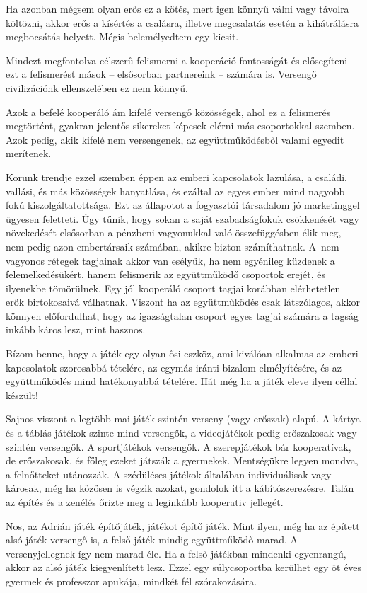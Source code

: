 \documentclass[12pt,a4paper]{article}
\begin{document}
Ha azonban mégsem olyan erős ez a kötés, mert igen könnyű válni vagy távolra költözni, akkor erős a kísértés a csalásra, illetve megcsalatás esetén a kihátrálásra megbocsátás helyett.
Mégis belemélyedtem egy kicsit.

Mindezt megfontolva célszerű felismerni a kooperáció fontosságát és elősegíteni ezt a felismerést mások -- elsősorban partnereink -- számára is.
Versengő civilizációnk ellenszelében ez nem könnyű.

Azok a befelé kooperáló ám kifelé versengő közösségek, ahol ez a felismerés megtörtént, gyakran jelentős sikereket képesek elérni más csoportokkal szemben.
Azok pedig, akik kifelé nem versengenek, az együttműködésből valami egyedit merítenek.

Korunk trendje ezzel szemben éppen az emberi kapcsolatok lazulása, a családi, vallási, és más közösségek hanyatlása, és ezáltal az egyes ember mind nagyobb fokú kiszolgáltatottsága.
Ezt az állapotot a fogyasztói társadalom jó marketinggel ügyesen feletteti.
Úgy tűnik, hogy sokan a saját szabadságfokuk csökkenését vagy növekedését elsősorban a pénzbeni vagyonukkal való összefüggésben élik meg, nem pedig azon embertársaik számában, akikre bizton számíthatnak.
A~nem vagyonos rétegek tagjainak akkor van esélyük, ha nem egyénileg küzdenek a felemelkedésükért, hanem felismerik az együttműködő csoportok erejét, és ilyenekbe tömörülnek.
Egy jól kooperáló csoport tagjai korábban elérhetetlen erők birtokosaivá válhatnak.
Viszont ha az együttműködés csak látszólagos, akkor könnyen előfordulhat, hogy az igazságtalan csoport egyes tagjai számára a tagság inkább káros lesz, mint hasznos.

Bízom benne, hogy a játék egy olyan ősi eszköz, ami kiválóan alkalmas az emberi kapcsolatok szorosabbá tételére, az egymás iránti bizalom elmélyítésére, és az együttműködés mind hatékonyabbá tételére.
Hát még ha a játék eleve ilyen céllal készült!

Sajnos viszont a legtöbb mai játék szintén verseny (vagy erőszak) alapú.
A kártya és a táblás játékok szinte mind versengők, a videojátékok pedig erőszakosak vagy szintén versengők.
A sportjátékok versengők.
A szerepjátékok bár kooperatívak, de erőszakosak, és főleg ezeket játszák a gyermekek.
Mentségükre legyen mondva, a felnőtteket utánozzák.
A szédüléses játékok általában individuálisak vagy károsak, még ha közösen is végzik azokat, gondolok itt a kábítószerezésre.
Talán az építés és a zenélés őrizte meg a leginkább kooperativ jellegét.

Nos, az Adrián játék építőjáték, játékot építő játék.
Mint ilyen, még ha az épített alsó játék versengő is, a felső játék mindig együttműködő marad.
A versenyjellegnek így nem marad éle.
Ha a felső játékban mindenki egyenrangú, akkor az alsó játék kiegyenlített lesz.
Ezzel egy súlycsoportba kerülhet egy öt éves gyermek és professzor apukája, mindkét fél szórakozására.
\end{document}
